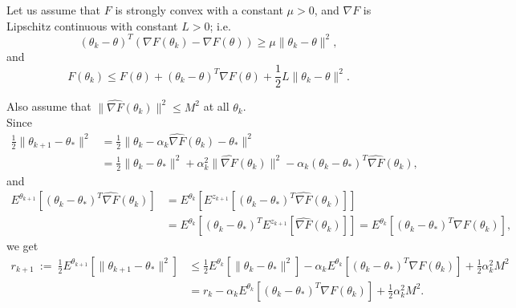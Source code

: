 \documentclass[12pt]{article}
\begin{document}
Let us assume that $F$ is strongly convex with a constant $\mu>0$, and $\nabla F$ is Lipschitz continuous with constant $L>0$; i.e.
\begin{equation}
(\theta_k - \theta)^T(\nabla F(\theta_k) - \nabla F(\theta)) \geq \mu\|\theta_k-\theta\|^2,
\label{eq:nest1}
\end{equation}
and
\begin{equation}
 F(\theta_k) \leq F(\theta) + (\theta_k-\theta)^T\nabla F(\theta) + \frac{1}{2}L\|\theta_k-\theta\|^2 .
\label{eq:nest2}
\end{equation}

\noindent
Also assume that $\|\hat{\nabla F}(\theta_k)\|^2\leq M^2$ at all $\theta_k$.\\  
Since
\begin{align*}
 \frac{1}{2}\|\theta_{k+1}-\theta_\ast\|^2 &= \frac{1}{2}\|\theta_k-\alpha_k\hat{\nabla F}(\theta_k)-\theta_\ast\|^2\\
 &=\frac{1}{2}\|\theta_k-\theta_\ast\|^2 + \alpha_k^2\|\hat{\nabla F}(\theta_k)\|^2 -\alpha_k(\theta_k-\theta_\ast)^T \hat{\nabla F}(\theta_k),
\end{align*}
and
\begin{align*}
 E^{\theta_{k+1}}[(\theta_k-\theta_\ast)^T \hat{\nabla F}(\theta_k)] &= E^{\theta_k}[E^{z_{k+1}}[(\theta_k-\theta_\ast)^T \hat{\nabla F}(\theta_k)]]\\
 &=E^{\theta_k}[(\theta_k-\theta_\ast)^T E^{z_{k+1}}[\hat{\nabla F}(\theta_k)]] = E^{\theta_k}[(\theta_k-\theta_\ast)^T\nabla F(\theta_k)],
\end{align*}
we get 
\begin{align*}
 r_{k+1} \ := \ \frac{1}{2}E^{\theta_{k+1}}[\|\theta_{k+1}-\theta_\ast\|^2] &\leq \frac{1}{2}E^{\theta_k}[\|\theta_k-\theta_\ast\|^2] -\alpha_k E^{\theta_k}[(\theta_k-\theta_\ast)^T\nabla F(\theta_k)] + \frac{1}{2}\alpha_k^2M^2 \\
  &= r_k -\alpha_k E^{\theta_k}[(\theta_k-\theta_\ast)^T\nabla F(\theta_k)] + \frac{1}{2}\alpha_k^2M^2.
\end{align*}
\end{document}
